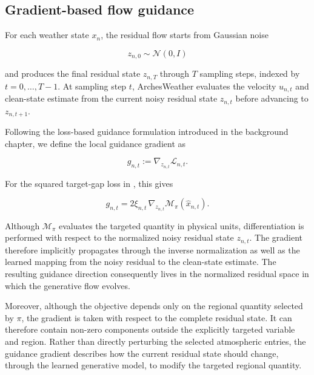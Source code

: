 \subsection{Gradient-based flow guidance}
\label{sec:gradient-flow-guidance}

For each weather state $x_n$, the residual flow starts from Gaussian noise

\[
    z_{n,0}
    \sim
    \mathcal{N}(0,I)
\]

and produces the final residual state $z_{n,T}$ through $T$ sampling steps,
indexed by $t=0,\ldots,T-1$. At sampling step $t$, ArchesWeather evaluates the
velocity $u_{n,t}$ and clean-state estimate from the current noisy residual
state $z_{n,t}$ before advancing to $z_{n,t+1}$.

Following the loss-based guidance formulation introduced in the background
chapter, we define the local guidance gradient as

\begin{equation}
    g_{n,t}
    :=
    \nabla_{z_{n,t}}
    \mathcal{L}_{n,t}.
    \label{eq:guidance-gradient}
\end{equation}

For the squared target-gap loss in , this gives

\begin{equation}
    g_{n,t}
    =
    2\xi_{n,t}\,
    \nabla_{z_{n,t}}
    \mathcal{M}_\pi
    \left(
        \hat{x}_{n,t}
    \right).
    \label{eq:guidance-gradient-expanded}
\end{equation}

Although $\mathcal{M}_\pi$ evaluates the targeted quantity in physical units,
differentiation is performed with respect to the normalized noisy residual
state $z_{n,t}$. The gradient therefore implicitly propagates through the
inverse normalization as well as the learned mapping from the noisy residual
to the clean-state estimate. The resulting guidance direction consequently
lives in the normalized residual space in which the generative flow evolves.

Moreover, although the objective depends only on the regional quantity selected
by $\pi$, the gradient is taken with respect to the complete residual state.
It can therefore contain non-zero components outside the explicitly targeted
variable and region. Rather than directly perturbing the selected atmospheric
entries, the guidance gradient describes how the current residual state should
change, through the learned generative model, to modify the targeted regional
quantity.

